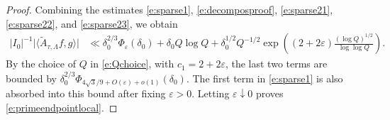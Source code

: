 \documentclass[12pt,reqno]{amsart}
\numberwithin{equation}{section}
\theoremstyle{definition}
\theoremstyle{remark}
\begin{document}
\begin{proof}
Combining the estimates \eqref{e:sparse1}, \eqref{e:decomposproof}, \eqref{e:sparse21}, \eqref{e:sparse22}, and \eqref{e:sparse23}, we obtain
\begin{align*}
 |I_0|^{-1}
 \big|\langle\widetilde A_{\tau,\Lambda}f,g\rangle\big|
 &\ll\delta_0^{2/3}\Phi_{\varepsilon}(\delta_0)
 +\delta_0Q\log Q+\delta_0^{1/2}Q^{-1/2}
 \exp\left((2+2\varepsilon)\frac{(\log Q)^{1/2}}{\log\log Q}\right).
\end{align*}
By the choice of \(Q\) in \eqref{e:Qchoice}, with \(c_1=2+2\varepsilon\),
the last two terms are bounded by $\delta_0^{2/3}
 \Phi_{4\sqrt3/9+O(\varepsilon)+o(1)}(\delta_0).$
The first term in \eqref{e:sparse1} is also absorbed into this bound after
fixing \(\varepsilon>0\).  Letting \(\varepsilon\downarrow0\) proves
\eqref{e:primeendpointlocal}.
\end{proof}
\end{document}
